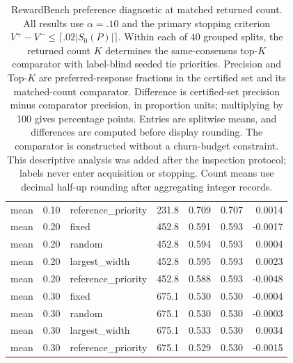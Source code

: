 \begin{table}[t]
\begin{tabular}{lllr rrr}
mean & 0.10 & reference\_priority & 231.8 & 0.709 & 0.707 & 0.0014 \\
mean & 0.20 & fixed & 452.8 & 0.591 & 0.593 & -0.0017 \\
mean & 0.20 & random & 452.8 & 0.594 & 0.593 & 0.0004 \\
mean & 0.20 & largest\_width & 452.8 & 0.595 & 0.593 & 0.0023 \\
mean & 0.20 & reference\_priority & 452.8 & 0.588 & 0.593 & -0.0048 \\
mean & 0.30 & fixed & 675.1 & 0.530 & 0.530 & -0.0004 \\
mean & 0.30 & random & 675.1 & 0.530 & 0.530 & -0.0003 \\
mean & 0.30 & largest\_width & 675.1 & 0.533 & 0.530 & 0.0034 \\
mean & 0.30 & reference\_priority & 675.1 & 0.529 & 0.530 & -0.0015 \\
\bottomrule
\end{tabular}
\caption{RewardBench preference diagnostic at matched returned count. All results use $\alpha=.10$ and the primary stopping criterion $V^+-V^-\le\lceil.02|S_0(P)|\rceil$. Within each of 40 grouped splits, the returned count $K$ determines the same-consensus top-$K$ comparator with label-blind seeded tie priorities. Precision and Top-$K$ are preferred-response fractions in the certified set and its matched-count comparator. Difference is certified-set precision minus comparator precision, in proportion units; multiplying by 100 gives percentage points. Entries are splitwise means, and differences are computed before display rounding. The comparator is constructed without a churn-budget constraint. This descriptive analysis was added after the inspection protocol; labels never enter acquisition or stopping. Count means use decimal half-up rounding after aggregating integer records.}
\label{tab:query-quality}
\end{table}
